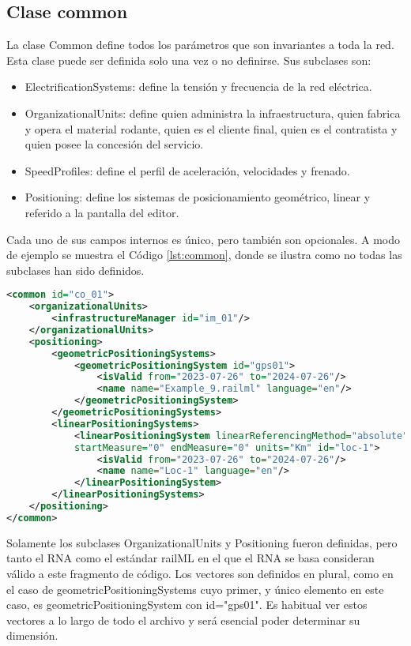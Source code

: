 \subsection{Clase common}
    \label{sec:common}

    La clase Common define todos los parámetros que son invariantes a toda la red. Esta clase puede ser definida solo una vez o no definirse. Sus subclases son:

    \begin{itemize}
        \item ElectrificationSystems: define la tensión y frecuencia de la red eléctrica.
        \item OrganizationalUnits: define quien administra la infraestructura, quien fabrica y opera el material rodante, quien es el cliente final, quien es el contratista y quien posee la concesión del servicio. 
        \item SpeedProfiles: define el perfil de aceleración, velocidades y frenado.
        \item Positioning: define los sistemas de posicionamiento geométrico, linear y referido a la pantalla del editor.
    \end{itemize}

    Cada uno de sus campos internos es único, pero también son opcionales. A modo de ejemplo se muestra el Código \ref{lst:common}, donde se ilustra como no todas las subclases han sido definidos.
    
    \begin{lstlisting}[language = XML, caption = Clase Common , label = {lst:common}]
<common id="co_01">
    <organizationalUnits>
        <infrastructureManager id="im_01"/>
    </organizationalUnits>
    <positioning>
        <geometricPositioningSystems>
            <geometricPositioningSystem id="gps01">
                <isValid from="2023-07-26" to="2024-07-26"/>
                <name name="Example_9.railml" language="en"/>
            </geometricPositioningSystem>
        </geometricPositioningSystems>
        <linearPositioningSystems>
            <linearPositioningSystem linearReferencingMethod="absolute" 
            startMeasure="0" endMeasure="0" units="Km" id="loc-1">
                <isValid from="2023-07-26" to="2024-07-26"/>
                <name name="Loc-1" language="en"/>
            </linearPositioningSystem>
        </linearPositioningSystems>
    </positioning>
</common>
    \end{lstlisting}

    Solamente los subclases OrganizationalUnits y Positioning fueron definidas, pero tanto el RNA como el estándar railML en el que el RNA se basa consideran válido a este fragmento de código. Los vectores son definidos en plural, como en el caso de geometricPositioningSystems cuyo primer, y único elemento en este caso, es geometricPositioningSystem con id="gps01". Es habitual ver estos vectores a lo largo de todo el archivo y será esencial poder determinar su dimensión.